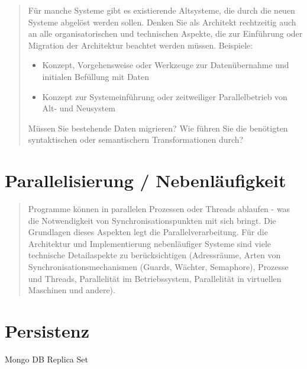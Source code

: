 \begin{quote}
	Für manche Systeme gibt es existierende Altsysteme, die durch die neuen Systeme abgelöst werden sollen. Denken Sie als Architekt rechtzeitig auch an alle organisatorischen und technischen Aspekte, die zur Einführung oder Migration der Architektur beachtet werden müssen.
	Beispiele:
	\begin{itemize}
		\item Konzept, Vorgehensweise oder Werkzeuge zur Datenübernahme und initialen Befüllung mit Daten
		\item Konzept zur Systemeinführung oder zeitweiliger Parallelbetrieb von Alt- und Neusystem
	\end{itemize}
	Müssen Sie bestehende Daten migrieren? Wie führen Sie die benötigten syntaktischen oder semantischern Transformationen durch?
\end{quote}

\section{Parallelisierung / Nebenläufigkeit}

\begin{quote}
	Programme können in parallelen Prozessen oder Threads ablaufen - was die Notwendigkeit von Synchronisationspunkten mit sich bringt. Die Grundlagen dieses Aspekten legt die Parallelverarbeitung. Für die Architektur und Implementierung nebenläufiger Systeme sind viele technische Detailaspekte zu berücksichtigen (Adressräume, Arten von Synchronisationsmechanismen (Guards, Wächter, Semaphore), Prozesse und Threads, Parallelität im Betriebssystem, Parallelität in virtuellen Maschinen und andere).
\end{quote}

\section{Persistenz}
\label{persistenz}

Mongo DB
Replica Set

